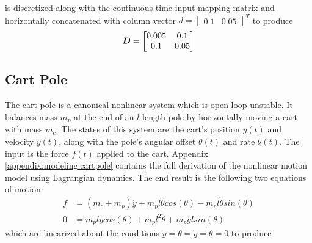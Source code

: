 is discretized along with the continuous-time input mapping matrix and horizontally concatenated with column vector $d = \begin{bmatrix} 0.1 & 0.05 \end{bmatrix}^{T}$ to produce
\begin{equation*}
\begin{aligned}
    \vb*{D} = \begin{bmatrix}
        0.005 & 0.1\\
        0.1 & 0.05\\
    \end{bmatrix}
\end{aligned}
\end{equation*}

\subsection{Cart Pole}
The cart-pole is a canonical nonlinear system which is open-loop unstable.  It balances mass $m_{p}$ at the end of an $l$-length pole by horizontally moving a cart with mass $m_{c}$.  The states of this system are the cart's position $y(t)$ and velocity $\dot{y}(t)$, along with the pole's angular offset $\theta(t)$ and rate $\dot{\theta}(t)$.  The input is the force $f(t)$ applied to the cart.  Appendix \ref{appendix:modeling:cartpole} contains the full derivation of the nonlinear motion model using Lagrangian dynamics.  The end result is the following two equations of motion:
\begin{subequations}
\begin{align}
	f &= (m_{c} + m_{p})\ddot{y} + m_{p}l\ddot{\theta}cos(\theta) - m_{p}l\dot{\theta}sin(\theta)\\
	0 &= m_{p}l\ddot{y}cos(\theta) + m_{p}l^{2}\ddot{\theta} + m_{p}glsin(\theta)
\end{align}
\end{subequations}
which are linearized about the conditions $y = \theta = \dot{y} = \dot{\theta} = 0$ to produce
